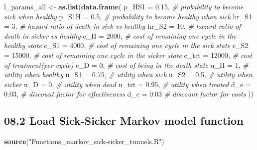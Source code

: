 \documentclass[]{article}
\newenvironment{Shaded}{\begin{snugshade}}{\end{snugshade}}
\newcommand{\KeywordTok}[1]{\textcolor[rgb]{0.13,0.29,0.53}{\textbf{#1}}}
\newcommand{\DataTypeTok}[1]{\textcolor[rgb]{0.13,0.29,0.53}{#1}}
\newcommand{\DecValTok}[1]{\textcolor[rgb]{0.00,0.00,0.81}{#1}}
\newcommand{\FloatTok}[1]{\textcolor[rgb]{0.00,0.00,0.81}{#1}}
\newcommand{\StringTok}[1]{\textcolor[rgb]{0.31,0.60,0.02}{#1}}
\newcommand{\CommentTok}[1]{\textcolor[rgb]{0.56,0.35,0.01}{\textit{#1}}}
\newcommand{\NormalTok}[1]{#1}
\begin{document}
\begin{Shaded}
\begin{Highlighting}[]
\NormalTok{l_params_all <-}\StringTok{ }\KeywordTok{as.list}\NormalTok{(}\KeywordTok{data.frame}\NormalTok{(}
  \DataTypeTok{p_HS1   =} \FloatTok{0.15}\NormalTok{,                }\CommentTok{# probability to become sick when healthy}
  \DataTypeTok{p_S1H   =} \FloatTok{0.5}\NormalTok{,               }\CommentTok{# probability to become healthy when sick}
  \DataTypeTok{hr_S1   =} \DecValTok{3}\NormalTok{,                 }\CommentTok{# hazard ratio of death in sick vs healthy}
  \DataTypeTok{hr_S2   =} \DecValTok{10}\NormalTok{,                }\CommentTok{# hazard ratio of death in sicker vs healthy}
  \DataTypeTok{c_H     =} \DecValTok{2000}\NormalTok{,              }\CommentTok{# cost of remaining one cycle in the healthy state}
  \DataTypeTok{c_S1    =} \DecValTok{4000}\NormalTok{,              }\CommentTok{# cost of remaining one cycle in the sick state}
  \DataTypeTok{c_S2    =} \DecValTok{15000}\NormalTok{,             }\CommentTok{# cost of remaining one cycle in the sicker state}
  \DataTypeTok{c_trt   =} \DecValTok{12000}\NormalTok{,             }\CommentTok{# cost of treatment(per cycle)}
  \DataTypeTok{c_D     =} \DecValTok{0}\NormalTok{,                 }\CommentTok{# cost of being in the death state}
  \DataTypeTok{u_H     =} \DecValTok{1}\NormalTok{,                 }\CommentTok{# utility when healthy}
  \DataTypeTok{u_S1    =} \FloatTok{0.75}\NormalTok{,              }\CommentTok{# utility when sick}
  \DataTypeTok{u_S2    =} \FloatTok{0.5}\NormalTok{,               }\CommentTok{# utility when sicker}
  \DataTypeTok{u_D     =} \DecValTok{0}\NormalTok{,                 }\CommentTok{# utility when dead}
  \DataTypeTok{u_trt   =} \FloatTok{0.95}\NormalTok{,              }\CommentTok{# utility when treated}
  \DataTypeTok{d_e    =} \FloatTok{0.03}\NormalTok{,               }\CommentTok{# discount factor for effectiveness}
  \DataTypeTok{d_c    =} \FloatTok{0.03}                \CommentTok{# discount factor for costs}
\NormalTok{))}
\end{Highlighting}
\end{Shaded}

\subsection{08.2 Load Sick-Sicker Markov model
function}\label{load-sick-sicker-markov-model-function}

\begin{Shaded}
\begin{Highlighting}[]
\KeywordTok{source}\NormalTok{(}\StringTok{"Functions_markov_sick-sicker_tunnels.R"}\NormalTok{)}
\end{Highlighting}
\end{Shaded}
\end{document}
